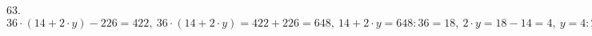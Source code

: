 63. $36\cdot(14+2\cdot y)-226=422,\ 36\cdot(14+2\cdot y)=422+226=648,\ 14+2\cdot y=648:36=18,\ 2\cdot y=18-14=4,\ y=4:2=2.$\\
